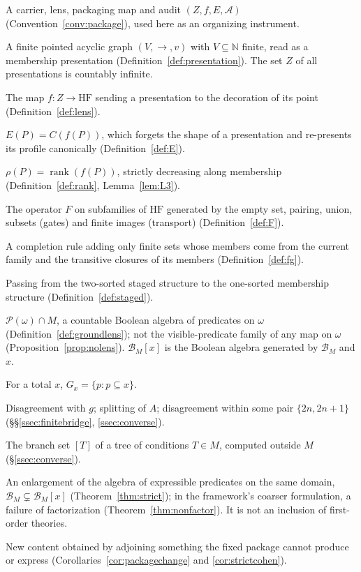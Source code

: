 \documentclass[11pt]{article}
\newcommand{\HF}{\mathrm{HF}}                 \newcommand{\rank}{\operatorname{rank}}
\newcommand{\powset}{\mathcal{P}}
\theoremstyle{definition}
\begin{document}
\begin{description}[style=multiline,leftmargin=!,labelwidth=0.27\textwidth,labelsep=0.8em,itemsep=3pt]
\item[Theory package.] A carrier, lens, packaging map and audit $(Z,f,E,\mathcal A)$
(Convention~\ref{conv:package}), used here as an organizing instrument.
\item[Presentation.] A finite pointed acyclic graph $(V,\to,v)$ with $V\subseteq\mathbb N$ finite,
read as a membership presentation (Definition~\ref{def:presentation}). The set $Z$ of all
presentations is countably infinite.
\item[Membership-profile lens.] The map $f\colon Z\to\HF$ sending a presentation to the decoration
of its point (Definition~\ref{def:lens}).
\item[Packaging map.] $E(P)=C(f(P))$, which forgets the shape of a presentation and re-presents its
profile canonically (Definition~\ref{def:E}).
\item[Rank audit.] $\rho(P)=\rank(f(P))$, strictly decreasing along membership
(Definition~\ref{def:rank}, Lemma~\ref{lem:L3}).
\item[Finite packaging operator.] The operator $F$ on subfamilies of $\HF$ generated by the empty
set, pairing, union, subsets (gates) and finite images (transport) (Definition~\ref{def:F}).
\item[Finitely generated rule.] A completion rule adding only finite sets whose members come from
the current family and the transitive closures of its members (Definition~\ref{def:fg}).
\item[Rank-erasure.] Passing from the two-sorted staged structure to the one-sorted membership
structure (Definition~\ref{def:staged}).
\item[Coded predicates $\mathcal B_M$.] $\powset(\omega)\cap M$, a countable Boolean algebra of
predicates on $\omega$ (Definition~\ref{def:groundlens}); not the visible-predicate family of any
map on $\omega$ (Proposition~\ref{prop:nolens}). $\mathcal B_M[x]$ is the Boolean algebra generated
by $\mathcal B_M$ and $x$.
\item[Restriction filter.] For a total $x$, $G_x=\{p:p\subseteq x\}$.
\item[$D_g$, $E_A$, $D^\ast$.] Disagreement with $g$; splitting of $A$; disagreement within some pair
$\{2n,2n+1\}$ (\S\S\ref{ssec:finitebridge}, \ref{ssec:converse}).
\item[Coded closed set.] The branch set $[T]$ of a tree of conditions $T\in M$, computed outside
$M$ (\S\ref{ssec:converse}).
\item[Strict extension.] An enlargement of the algebra of expressible predicates on the same
domain, $\mathcal B_M\subsetneq\mathcal B_M[x]$ (Theorem~\ref{thm:strict}); in the framework's
coarser formulation, a failure of factorization (Theorem~\ref{thm:nonfactor}). It is not an
inclusion of first-order theories.
\item[Package change.] New content obtained by adjoining something the fixed package cannot produce
or express (Corollaries~\ref{cor:packagechange} and \ref{cor:strictcohen}).
\end{description}
\end{document}
